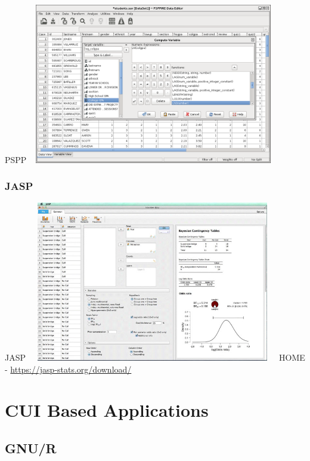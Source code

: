 \documentclass{beamer}
\begin{document}
\begin{frame}{PSPP}
\centering 
\includegraphics[height=7cm, width=11cm]{pspp}
\end{frame}

\subsubsection{JASP}

\begin{frame}{JASP}
\centering 
\includegraphics[height=7cm, width=11cm]{jasp}
HOME - \url{https://jasp-stats.org/download/}
\end{frame}

\section{CUI Based Applications}

\subsection{GNU/R}
\end{document}
